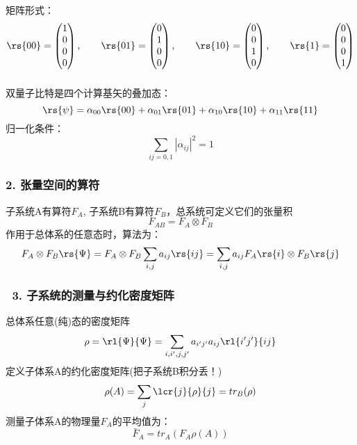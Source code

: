 \begin{frame}
矩阵形式：
    \[
\rs{00} = 
\begin{pmatrix}
    1\\
    0\\
    0\\
    0
\end{pmatrix},\qquad
\rs{01} = 
\begin{pmatrix}
    0\\
    1\\
    0\\
    0
\end{pmatrix},\qquad
\rs{10} = 
\begin{pmatrix}
    0\\
    0\\
    1\\
    0
\end{pmatrix},\qquad
\rs{1} = 
\begin{pmatrix}
    0\\
    0\\
    0\\
    1
\end{pmatrix}
\] 
\end{frame}

\begin{frame}
    \frametitle{}
    双量子比特是四个计算基矢的叠加态：
    \[\rs{\psi} =\alpha_{00}\rs{00}+\alpha_{01}\rs{01}+\alpha_{10}\rs{10}+\alpha_{11}\rs{11}\]
    归一化条件：
    \[ \sum_{ij=0,1} |\alpha_{ij}|^2= 1\]
\end{frame}

\begin{frame}
      \frametitle{ 2. 张量空间的算符}
    子系统A有算符$F_A$, 子系统B有算符$F_B$，总系统可定义它们的张量积
    \[F_{AB}=F_A \otimes F_B\]
    作用于总体系的任意态时，算法为：
    \[F_A \otimes F_B \rs{\Psi} = F_A \otimes F_B \sum_{i,j} a_{ij}\rs{ij}=  \sum_{i,j} a_{ij}F_A \rs{i}\otimes F_B\rs{j}\]   
\end{frame}

\begin{frame}
    \frametitle{~3. 子系统的测量与约化密度矩阵}
    总体系任意(纯)态的密度矩阵
    \[ \rho=\rl{\Psi} {\Psi}= \sum_{i,i',j,j'} a_{i'j'}a_{ij}\rl{i'j'}{ij}\] 
    定义子体系A的约化密度矩阵(把子系统B积分丢！)
    \[ \rho(A)=\sum_{j}\lcr{j}{\rho}{j}=tr_B(\rho)\] 
    测量子体系A的物理量$F_A$的平均值为：
    \[ \bar{F}_A=tr_A(F_A\rho(A))\] 
    
\end{frame}

